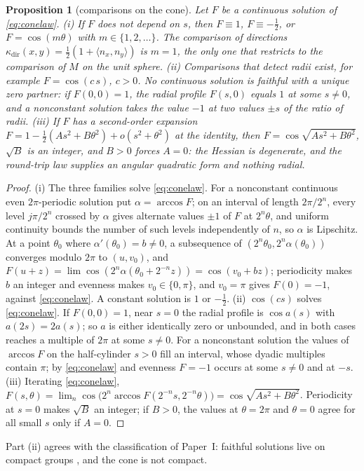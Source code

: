 \documentclass[aps,pra,onecolumn,superscriptaddress,nofootinbib,10pt]{revtex4-2}
\newtheorem{proposition}[theorem]{Proposition}
\theoremstyle{definition}
\theoremstyle{remark}
\newcommand{\ip}[2]{\langle #1,#2\rangle}
\begin{document}
\begin{proposition}[comparisons on the cone]\label{prop:cone}
Let $F$ be a continuous solution of \eqref{eq:conelaw}.
(i) If $F$ does not depend on $s$, then $F\equiv1$, $F\equiv-\tfrac12$, or $F=\cos(m\theta)$ with $m\in\{1,2,\dots\}$.  The comparison
of directions $\kappa_{\mathrm{dir}}(x,y)=\tfrac12(1+\ip{n_x}{n_y})$ is $m=1$, the only one that restricts to the comparison of $M$ on
the unit sphere.
(ii) Comparisons that detect radii exist, for example $F=\cos(c\,s)$, $c>0$.  No continuous solution is
faithful with a unique zero partner: if $F(0,0)=1$, the radial profile $F(s,0)$ equals $1$ at some $s\ne0$, and a
nonconstant solution takes the value $-1$ at two values $\pm s$ of the ratio of radii.
(iii) If $F$ has a second-order expansion $F=1-\tfrac12(As^2+B\theta^2)+o(s^2+\theta^2)$ at the identity, then
$F=\cos\sqrt{As^2+B\theta^2}$, $\sqrt B$ is an integer, and $B>0$ forces $A=0$: the Hessian is degenerate, and the
round-trip law supplies an angular quadratic form and nothing radial.
\end{proposition}
\begin{proof}
(i) The three families solve \eqref{eq:conelaw}.  For a nonconstant continuous even $2\pi$-periodic solution put
$\alpha=\arccos F$; on an interval of length $2\pi/2^n$, every level $j\pi/2^n$ crossed by $\alpha$ gives alternate
values $\pm1$ of $F$ at $2^n\theta$, and uniform continuity bounds the number of such levels independently of
$n$, so $\alpha$ is Lipschitz.  At a point $\theta_0$ where $\alpha'(\theta_0)=b\ne0$, a subsequence of $(2^n\theta_0,2^n\alpha(\theta_0))$
converges modulo $2\pi$ to $(u,v_0)$, and $F(u+z)=\lim\cos(2^n\alpha(\theta_0+2^{-n}z))=\cos(v_0+bz)$; periodicity
makes $b$ an integer and evenness makes $v_0\in\{0,\pi\}$, and $v_0=\pi$ gives $F(0)=-1$, against \eqref{eq:conelaw}.
A constant solution is $1$ or $-\tfrac12$.
(ii) $\cos(cs)$ solves \eqref{eq:conelaw}.  If $F(0,0)=1$, near $s=0$ the radial profile is $\cos a(s)$ with $a(2s)=2a(s)$; so
$a$ is either identically zero or unbounded, and in both cases reaches a multiple of $2\pi$ at some $s\ne0$.  For
a nonconstant solution the values of $\arccos F$ on the half-cylinder $s>0$ fill an interval, whose dyadic
multiples contain $\pi$; by \eqref{eq:conelaw} and evenness $F=-1$ occurs at some $s\ne0$ and at $-s$.
(iii) Iterating \eqref{eq:conelaw}, $F(s,\theta)=\lim_n\cos\bigl(2^n\arccos F(2^{-n}s,2^{-n}\theta)\bigr)=\cos\sqrt{As^2+B\theta^2}$.
Periodicity at $s=0$ makes $\sqrt B$ an integer; if $B>0$, the values at $\theta=2\pi$ and $\theta=0$ agree for all
small $s$ only if $A=0$.
\end{proof}
Part (ii) agrees with the classification of Paper~I: faithful solutions live on compact groups
\cite[Thm.~3.11]{PaperI}, and the cone is not compact.
\end{document}
